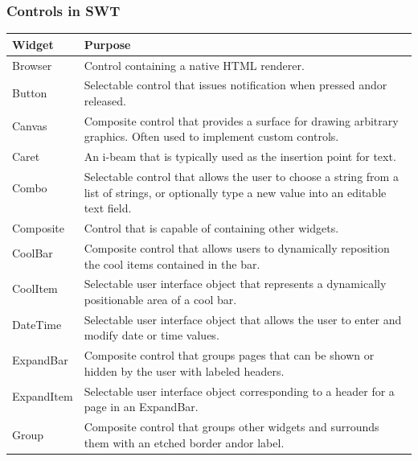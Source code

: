 \subsubsection{Controls in SWT}
\cite{swtcontrol}
\begin{center}
\begin{tabular}{l|l}
Widget & Purpose\\
\hline
Browser & Control containing a native HTML renderer.\\
Button & Selectable control that issues notification when pressed and\/or released.\\
Canvas & \multirow{2}{*}{\parbox{12cm}{Composite control that provides a surface for drawing arbitrary graphics. Often used to implement custom controls.}}\\
& \\
Caret & An i-beam that is typically used as the insertion point for text.\\
Combo & \multirow{2}{*}{\parbox{12cm}{Selectable control that allows the user to choose a string from a list of strings, or optionally type a new value into an editable text field.}}\\
&\\
Composite & Control that is capable of containing other widgets.\\
CoolBar & \multirow{2}{*}{\parbox{12cm}{Composite control that allows users to dynamically reposition the cool items contained in the bar.}}\\
&\\
CoolItem & \multirow{2}{*}{\parbox{12cm}{Selectable user interface object that represents a dynamically positionable area of a cool bar.}}\\
&\\
DateTime & \multirow{2}{*}{\parbox{12cm}{Selectable user interface object that allows the user to enter and modify date or time values.}}\\
&\\
ExpandBar & \multirow{2}{*}{\parbox{12cm}{Composite control that groups pages that can be shown or hidden by the user with labeled headers.}}\\
&\\
ExpandItem & \multirow{2}{*}{\parbox{12cm}{Selectable user interface object corresponding to a header for a page in an ExpandBar.}}\\
&\\
Group & \multirow{2}{*}{\parbox{12cm}{Composite control that groups other widgets and surrounds them with an etched border and\/or label.}}\\

\end{tabular}
\end{center}
